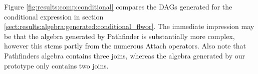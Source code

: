 Figure \ref{fig:results:comp:conditional} compares the DAGs generated for the
conditional expression in section
\ref{sect:results:algebra:generated:conditional_flwor}. The immediate
impression may be that the algebra generated by Pathfinder is substantially more
complex, however this stems partly from the numerous \textsf{Attach} operators.
Also note that Pathfinders algebra contains three joins, whereas the algebra
generated by our prototype only contains two joins.

\newpage
\begin{figure}[!h]
	\centering
	\mbox{
		\quad
		}
\end{figure}
